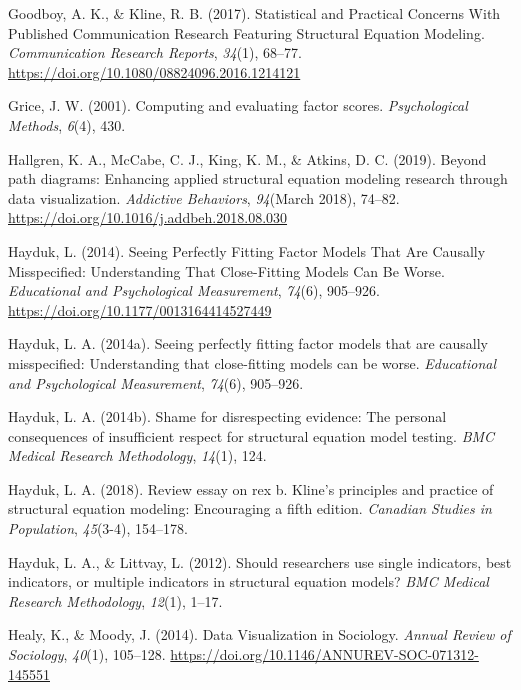 \documentclass[
  english,
  doc]{apa6}
\newlength{\cslhangindent}
\newenvironment{cslreferences}%
  {\setlength{\parindent}{0pt}%
  \everypar{\setlength{\hangindent}{\cslhangindent}}\ignorespaces}%
  {\par}
\begin{document}
\begin{cslreferences}
\leavevmode\hypertarget{ref-Goodboy2017}{}%
Goodboy, A. K., \& Kline, R. B. (2017). Statistical and Practical Concerns With Published Communication Research Featuring Structural Equation Modeling. \emph{Communication Research Reports}, \emph{34}(1), 68--77. \url{https://doi.org/10.1080/08824096.2016.1214121}

\leavevmode\hypertarget{ref-grice2001computing}{}%
Grice, J. W. (2001). Computing and evaluating factor scores. \emph{Psychological Methods}, \emph{6}(4), 430.

\leavevmode\hypertarget{ref-Hallgren2019a}{}%
Hallgren, K. A., McCabe, C. J., King, K. M., \& Atkins, D. C. (2019). Beyond path diagrams: Enhancing applied structural equation modeling research through data visualization. \emph{Addictive Behaviors}, \emph{94}(March 2018), 74--82. \url{https://doi.org/10.1016/j.addbeh.2018.08.030}

\leavevmode\hypertarget{ref-Hayduk2014}{}%
Hayduk, L. (2014). Seeing Perfectly Fitting Factor Models That Are Causally Misspecified: Understanding That Close-Fitting Models Can Be Worse. \emph{Educational and Psychological Measurement}, \emph{74}(6), 905--926. \url{https://doi.org/10.1177/0013164414527449}

\leavevmode\hypertarget{ref-hayduk2014seeing}{}%
Hayduk, L. A. (2014a). Seeing perfectly fitting factor models that are causally misspecified: Understanding that close-fitting models can be worse. \emph{Educational and Psychological Measurement}, \emph{74}(6), 905--926.

\leavevmode\hypertarget{ref-hayduk2014shame}{}%
Hayduk, L. A. (2014b). Shame for disrespecting evidence: The personal consequences of insufficient respect for structural equation model testing. \emph{BMC Medical Research Methodology}, \emph{14}(1), 124.

\leavevmode\hypertarget{ref-hayduk2018review}{}%
Hayduk, L. A. (2018). Review essay on rex b. Kline's principles and practice of structural equation modeling: Encouraging a fifth edition. \emph{Canadian Studies in Population}, \emph{45}(3-4), 154--178.

\leavevmode\hypertarget{ref-hayduk2012should}{}%
Hayduk, L. A., \& Littvay, L. (2012). Should researchers use single indicators, best indicators, or multiple indicators in structural equation models? \emph{BMC Medical Research Methodology}, \emph{12}(1), 1--17.

\leavevmode\hypertarget{ref-Healy2014a}{}%
Healy, K., \& Moody, J. (2014). Data Visualization in Sociology. \emph{Annual Review of Sociology}, \emph{40}(1), 105--128. \url{https://doi.org/10.1146/ANNUREV-SOC-071312-145551}


\end{cslreferences}
\end{document}

